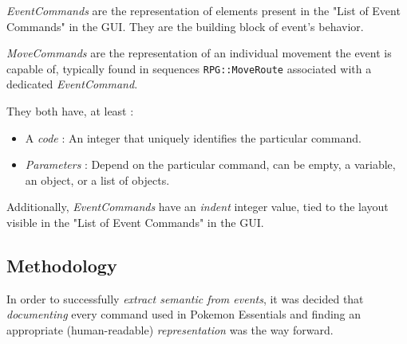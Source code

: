 \documentclass[11pt]{article}
\begin{document}
\textit{EventCommands} are the representation of elements present in the "List of Event Commands" in the GUI. They are the building block of event's behavior.

\textit{MoveCommands} are the representation of an individual movement the event is capable of, typically found in sequences \verb|RPG::MoveRoute| associated with a dedicated \textit{EventCommand}.

They both have, at least :
\begin{itemize}
	\item A \textit{code} : An integer that uniquely identifies the particular command.
	\item \textit{Parameters} : Depend on the particular command, can be empty, a variable, an object, or a list of objects.
\end{itemize}

Additionally, \textit{EventCommands} have an \textit{indent} integer value, tied to the layout visible in the "List of Event Commands" in the GUI.


\subsection{Methodology}

In order to successfully \textit{extract semantic from events}, it was decided that \textit{documenting} every command used in Pokemon Essentials and finding an appropriate (human-readable) \textit{representation} was the way forward.



\end{document}
